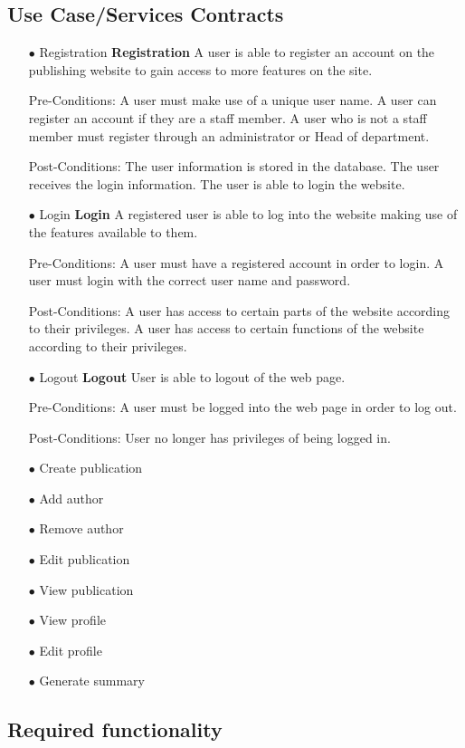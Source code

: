 \documentclass[a4paper,12pt]{article}
\begin{document}
\subsection{Use Case/Services Contracts}
\begin{itemize}
	\item[$\bullet$]Registration
	\textbf{Registration}
	A user is able to register an account on the publishing website to gain access to more features on the site.

	Pre-Conditions: 
	A user must make use of a unique user name.
	A user can register an account if they are a staff member.
	A user who is not a staff member must register through an administrator or Head of department.

	Post-Conditions: 
	The user information is stored in the database.
	The user receives the login information.
	The user is able to login the website.
	\item[$\bullet$]Login
	\textbf{Login}
	A registered user is able to log into the website making use of the features available to them.
	
	Pre-Conditions: 
	A user must have a registered account in order to login.
	A user must login with the correct user name and password.

	Post-Conditions: 
	A user has access to certain parts of the website according to their privileges.
	A user has access to certain functions of the website according to their privileges.
	\item[$\bullet$]Logout
	\textbf{Logout}
	User is able to logout of the web page.
	
	Pre-Conditions: 
	A user must be logged into the web page in order to log out.

	Post-Conditions: 
	User no longer has privileges of being logged in.
	\item[$\bullet$]Create publication
	\item[$\bullet$]Add author
	\item[$\bullet$]Remove author
	\item[$\bullet$]Edit publication
	\item[$\bullet$]View publication
	\item[$\bullet$]View profile
	\item[$\bullet$]Edit profile
	\item[$\bullet$]Generate summary
	\\
\end{itemize}
\subsection{Required functionality}
\end{document}
